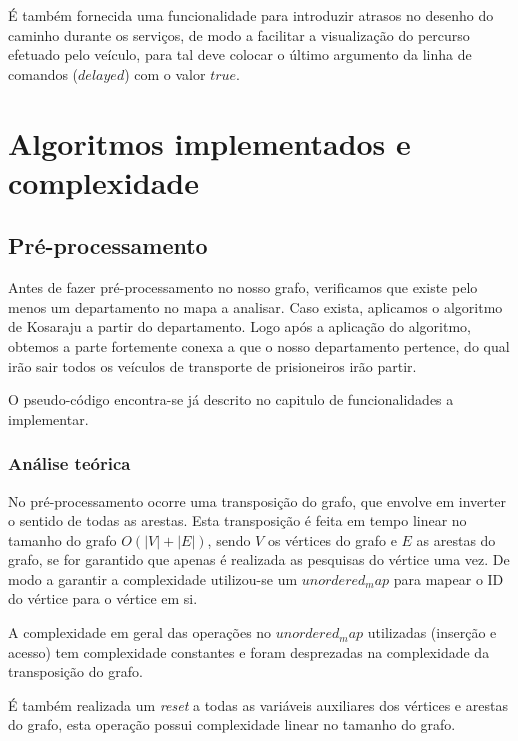 \documentclass[article, a4paper, 12pt, oneside]{memoir}
\begin{document}
É também fornecida uma funcionalidade para introduzir atrasos no desenho do caminho durante os serviços, de modo a facilitar a visualização do percurso efetuado pelo veículo, para tal deve colocar o último argumento da linha de comandos ($delayed$) com o valor $true$.


\newpage
\chapter[Algoritmos implementados e complexidade][Algoritmos implementados e complexidade]{Algoritmos implementados e complexidade} \label{\thechapter}

\section{Pré-processamento}
Antes de fazer pré-processamento no nosso grafo, verificamos que existe pelo menos um departamento no mapa a analisar.
Caso exista, aplicamos o algoritmo de Kosaraju a partir do departamento. Logo após a aplicação do algoritmo, 
obtemos a parte fortemente conexa a que o nosso departamento pertence, do qual irão sair todos os veículos de transporte de prisioneiros irão partir.

O pseudo-código encontra-se já descrito no capitulo de funcionalidades a implementar.
\subsection{Análise teórica}
No pré-processamento ocorre uma transposição do grafo, que envolve em inverter o sentido de todas as arestas. Esta transposição é feita em tempo linear no tamanho do grafo $O(|V|+|E|)$, sendo $V$ os vértices do grafo e $E$ as arestas do grafo, se for garantido que apenas é realizada as pesquisas do vértice uma vez. De modo a garantir a complexidade utilizou-se um $unordered_map$ para mapear o ID do vértice para o vértice em si.

A complexidade em geral das operações no $unordered_map$ utilizadas (inserção e acesso) tem complexidade constantes e foram desprezadas na complexidade da transposição do grafo.

É também realizada um \textit{reset} a todas as variáveis auxiliares dos vértices e arestas do grafo, esta operação possui complexidade linear no tamanho do grafo.
\end{document}
